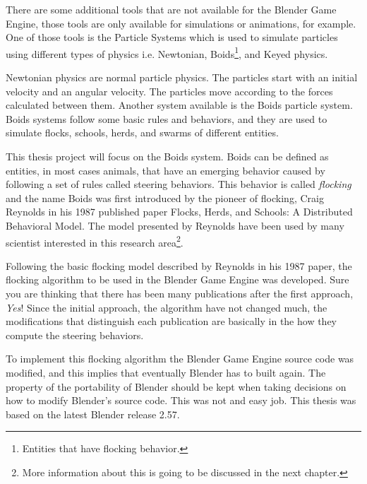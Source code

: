 
There are some additional tools that are not available for the Blender Game Engine, those tools are only available for simulations or animations, for example. One of those tools is the Particle Systems which is used to simulate particles using different types of physics i.e. Newtonian, Boids\footnote{Entities that have flocking behavior.}, and Keyed physics. 



Newtonian physics are normal particle physics. The particles start with an initial velocity and an angular velocity.  The particles move according to the forces calculated between them. Another system available is the Boids particle system. Boids systems follow some basic rules and behaviors, and they are used to simulate flocks, schools, herds, and swarms of different entities.

This thesis project will focus on the Boids system. Boids can be defined as entities, in most cases animals, that have an emerging behavior caused by following a set of rules called steering behaviors. This behavior is called \textit{flocking} and the name Boids was first introduced by the pioneer of flocking, Craig Reynolds in his 1987 published paper Flocks, Herds, and Schools: A Distributed Behavioral Model\cite{craig1}. The model presented by Reynolds have been used by many scientist interested in this research area\footnote{More information about this is going to be discussed in the next chapter.}.

Following the basic flocking model described by Reynolds in his 1987 paper, the flocking algorithm to be used in the Blender Game Engine was developed. Sure you are thinking that there has been many publications after the first approach, \textit{Yes}!  Since the initial approach, the algorithm have not changed much, the modifications that distinguish each publication are basically in the how they compute the steering behaviors.

To implement this flocking algorithm the Blender Game Engine source code was modified, and this implies that eventually Blender has to built again. The property of the portability of Blender should be kept when taking decisions on how to modify Blender's source code. This was not and easy job. This thesis was based on the latest Blender release 2.57. 

